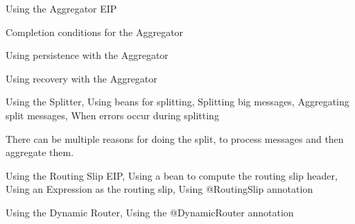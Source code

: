 \documentclass[Screen16to9,17pt]{foils}
\begin{document}


\begin{list2}
\item Using the Aggregator EIP
\item Completion conditions for the Aggregator
\item Using persistence with the Aggregator
\item Using recovery with the Aggregator
\end{list2}











\begin{list2}
\item Using the Splitter, Using beans for splitting,
Splitting big messages, Aggregating split messages,
When errors occur during splitting
\end{list2}




There can be multiple reasons for doing the split, to process messages and then aggregate them.



\begin{list2}
\item Using the Routing Slip EIP, Using a bean to compute the
routing slip header, Using an Expression as the routing
slip, Using @RoutingSlip annotation
\end{list2}

\begin{list2}
\item Using the Dynamic Router, Using the @DynamicRouter
 annotation
\end{list2}
\end{document}
